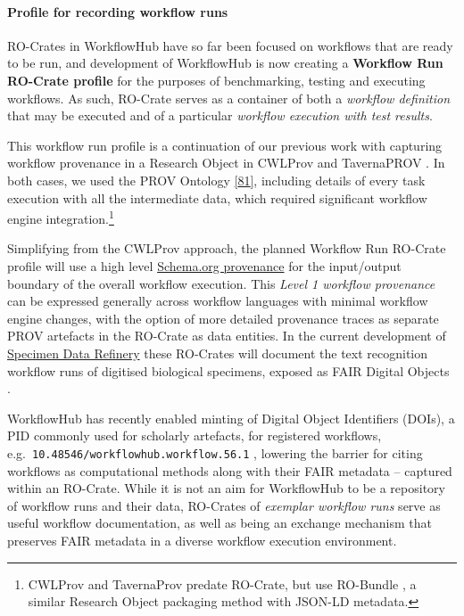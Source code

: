 {{\paragraph{Profile for recording workflow
runs}\label{profile-for-recording-workflow-runs}}

RO-Crates in WorkflowHub have so far been focused on workflows that are
ready to be run, and development of WorkflowHub is now creating a
\textbf{Workflow Run RO-Crate profile} for the purposes of benchmarking,
testing and executing workflows. As such, RO-Crate serves as a container
of both a \emph{workflow definition} that may be executed and of a
particular \emph{workflow execution with test results}.

This workflow run profile is a continuation of our previous work with
capturing workflow provenance in a Research Object in CWLProv
\cite{ch5-68} and
TavernaPROV \cite{ch5-110}.
In both cases, we used the PROV Ontology
\href{https://www.w3.org/TR/2013/REC-prov-o-20130430/}{{[}81{]}},
including details of every task execution with all the intermediate
data, which required significant workflow engine integration.\footnote{CWLProv
  and TavernaProv predate RO-Crate, but use RO-Bundle
  \cite{ch5-111}, a similar
  Research Object packaging method with JSON-LD metadata.}

Simplifying from the CWLProv approach, the planned Workflow Run RO-Crate
profile will use a high level
\href{https://www.researchobject.org/ro-crate/1.1/provenance.html\#software-used-to-create-files}{Schema.org
provenance} for the input/output boundary of the overall workflow
execution. This \emph{Level 1 workflow provenance}
\cite{ch5-68} can be
expressed generally across workflow languages with minimal workflow
engine changes, with the option of more detailed provenance traces as
separate PROV artefacts in the RO-Crate as data entities. In the current
development of \href{https://github.com/DiSSCo/SDR}{Specimen Data
Refinery} \cite{ch5-122} these
RO-Crates will document the text recognition workflow runs of digitised
biological specimens, exposed as FAIR Digital Objects
\cite{De Smedt 2020}.

WorkflowHub has recently enabled minting of Digital Object Identifiers
(DOIs), a PID commonly used for scholarly artefacts, for registered
workflows, e.g.~\texttt{10.48546/workflowhub.workflow.56.1}
\cite{ch5-83},
lowering the barrier for citing workflows as computational methods along
with their FAIR metadata -- captured within an RO-Crate. While it is not
an aim for WorkflowHub to be a repository of workflow runs and their
data, RO-Crates of \emph{exemplar workflow runs} serve as useful
workflow documentation, as well as being an exchange mechanism that
preserves FAIR metadata in a diverse workflow execution environment.

}
